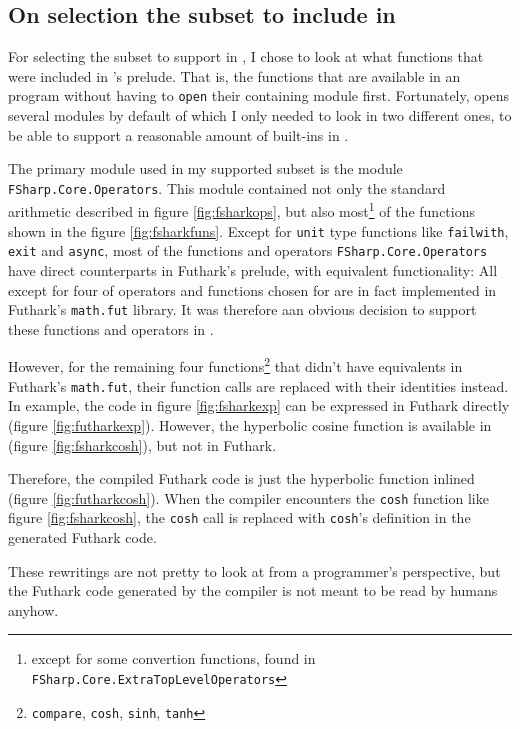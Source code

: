 \subsection{On selection the \fsharp{} subset to include in \fshark{}}
For selecting the \fsharp{} subset to support in \fshark{}, I chose to look at
what functions that were included in \fsharp{}'s prelude. That is, the
functions that are available in an \fsharp{} program without having to
\texttt{open} their containing module first.
Fortunately, \fsharp{} opens several modules by default of which I only
needed to look in two different ones, to be able to support a reasonable amount
of \fsharp{} built-ins in \fshark{}.

The primary module used in my supported \fsharp{} subset is the module
\texttt{FSharp.Core.Operators}.
This module contained not only the standard arithmetic described in figure
\ref{fig:fsharkops}, but also most\footnote{except for some convertion
  functions, found in \texttt{FSharp.Core.ExtraTopLevelOperators}} of the functions shown in the figure \ref{fig:fsharkfuns}.
Except for \texttt{unit} type functions like \texttt{failwith}, \texttt{exit}
and \texttt{async}, most of the functions and operators
\texttt{FSharp.Core.Operators} have direct counterparts in Futhark's prelude,
with equivalent functionality: All except for four of operators and functions chosen for
\fshark{} are in fact implemented in Futhark's \texttt{math.fut} library.
It was therefore aan obvious decision to support these functions and operators in
\fshark{}.

However, for the remaining four functions\footnote{\texttt{compare}, \texttt{cosh}, \texttt{sinh}, \texttt{tanh}} that didn't have equivalents in
Futhark's \texttt{math.fut}, their function calls are replaced with their
identities instead.
In example, the \fshark{} code in figure \ref{fig:fsharkexp} can be
expressed in Futhark directly (figure \ref{fig:futharkexp}).
However, the hyperbolic cosine function is available in \fsharp{} (figure
\ref{fig:fsharkcosh}), but not in Futhark.

Therefore, the compiled \fshark{} Futhark code is just the hyperbolic function
inlined (figure \ref{fig:futharkcosh}).
When the \fshark{} compiler encounters the \texttt{cosh} function like figure \ref{fig:fsharkcosh}, the \texttt{cosh} call is replaced with
  \texttt{cosh}'s definition in the \fshark{} generated Futhark code. 

These rewritings are not pretty to look at from a programmer's perspective, but
the Futhark code generated by the \fshark{} compiler is not meant to be read by humans anyhow.

